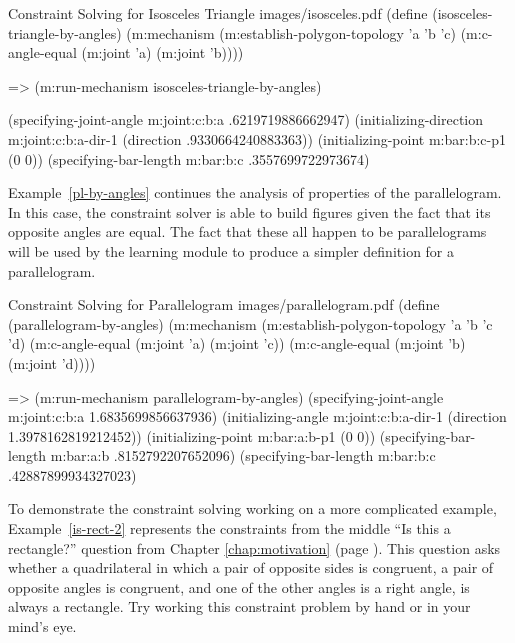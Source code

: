\begin{pdf-example}
[label=solve-i-t]
{Constraint Solving for Isosceles Triangle}
{images/isosceles.pdf}
(define (isosceles-triangle-by-angles)
  (m:mechanism
   (m:establish-polygon-topology 'a 'b 'c)
   (m:c-angle-equal (m:joint 'a)
                    (m:joint 'b))))

=> (m:run-mechanism  isosceles-triangle-by-angles)

(specifying-joint-angle m:joint:c:b:a .6219719886662947)
(initializing-direction m:joint:c:b:a-dir-1 (direction .9330664240883363))
(initializing-point m:bar:b:c-p1 (0 0))
(specifying-bar-length m:bar:b:c .3557699722973674)
\end{pdf-example}

Example~\ref{pl-by-angles} continues the analysis of properties of the
parallelogram. In this case, the constraint solver is able to build
figures given the fact that its opposite angles are equal. The fact
that these all happen to be parallelograms will be used by the
learning module to produce a simpler definition for a parallelogram.

\enlargethispage*{-\baselineskip}

\begin{pdf-example}
[label=pl-by-angles]
{Constraint Solving for Parallelogram}
{images/parallelogram.pdf}
(define (parallelogram-by-angles)
  (m:mechanism
   (m:establish-polygon-topology 'a 'b 'c 'd)
   (m:c-angle-equal (m:joint 'a)
                    (m:joint 'c))
   (m:c-angle-equal (m:joint 'b)
                    (m:joint 'd))))

=> (m:run-mechanism parallelogram-by-angles)
(specifying-joint-angle m:joint:c:b:a 1.6835699856637936)
(initializing-angle m:joint:c:b:a-dir-1 (direction 1.3978162819212452))
(initializing-point m:bar:a:b-p1 (0 0))
(specifying-bar-length m:bar:a:b .8152792207652096)
(specifying-bar-length m:bar:b:c .42887899934327023)
\end{pdf-example}

To demonstrate the constraint solving working on a more complicated
example, Example~\ref{is-rect-2} represents the constraints from the
middle ``Is this a rectangle?'' question from Chapter
\ref{chap:motivation} (page \pageref{example-1}). This question asks
whether a quadrilateral in which a pair of opposite sides is
congruent, a pair of opposite angles is congruent, and one of the
other angles is a right angle, is always a rectangle. Try working this
constraint problem by hand or in your mind's eye.

